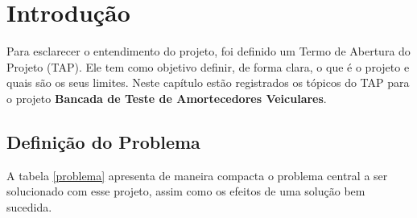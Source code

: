 \chapter[Introdução]{Introdução}
\label{chap:introducao}
	
	Para esclarecer o entendimento do projeto, foi definido um Termo de Abertura do Projeto (TAP). Ele tem como objetivo definir, de forma clara, o que é o projeto e quais são os seus limites. Neste capítulo estão registrados os tópicos do TAP para o projeto \textbf{Bancada de Teste de Amortecedores Veiculares}.

	\section{Definição do Problema}
	\label{sec:tap_problema}

		A tabela \ref{problema} apresenta de maneira compacta o problema central a ser solucionado com esse projeto, assim como os efeitos de uma solução bem sucedida.

